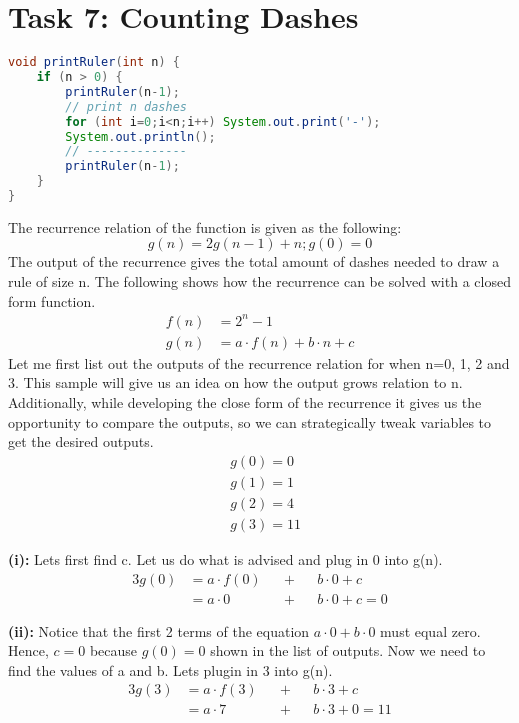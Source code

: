  \chapter{Task 7: Counting Dashes}

\begin{lstlisting}[language=Java]
void printRuler(int n) {
    if (n > 0) {
        printRuler(n-1);
        // print n dashes
        for (int i=0;i<n;i++) System.out.print('-');
        System.out.println();
        // --------------
        printRuler(n-1);
    }
}
\end{lstlisting}


The recurrence relation of the function  is given as the following:
\[
 g(n) = 2g(n-1) + n;  g(0) = 0
\]
The output of the recurrence gives the total amount of dashes needed to draw a rule of size n. The following shows how the recurrence can be solved with a closed form function.
\begin{align*}
    f(n) &= 2^n - 1\\
    g(n) &= a \cdot f(n) + b\cdot n + c  
\end{align*}
Let me first list out the outputs of the recurrence relation for when n=0, 1, 2 and 3. This sample will give us an idea on how the output grows relation to n. Additionally, while developing the close form of the recurrence it gives us the opportunity to compare the outputs, so we can strategically tweak variables to get the desired outputs.
\begin{align*}
&g(0) = 0\\
&g(1) = 1\\
&g(2) = 4\\
&g(3) = 11
\end{align*}

\textbf{(i):} 
Lets first find c. Let us do what is advised and plug in 0 into g(n).
\begin{alignat*}{3}
    g(0) &= a\cdot f(0) &&+ &&b\cdot 0 + c \\
         &= a\cdot 0 &&+  &&b\cdot 0 + c = 0
\end{alignat*}

\textbf{(ii):} 
Notice that the first 2 terms of the equation $a\cdot 0 + b\cdot 0$ must equal zero. Hence, $c=0$ because $g(0) = 0$ shown in the list of outputs.
Now we need to find the values of a and b. Lets plugin in 3 into g(n).
\begin{alignat*}{3}
    g(3) &= a\cdot f(3) &&+ &&b\cdot 3 + c \\
         &= a\cdot 7 &&+  &&b\cdot 3 + 0 = 11 
\end{alignat*}

